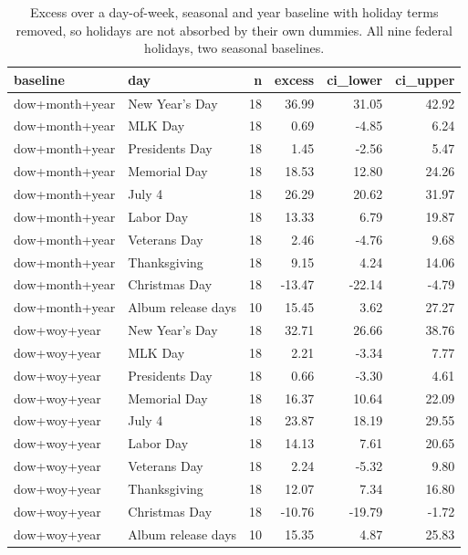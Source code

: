 \begin{table}
\caption{Excess over a day-of-week, seasonal and year baseline with holiday terms removed, so holidays are not absorbed by their own dummies. All nine federal holidays, two seasonal baselines.}
\begin{tabular}{llrrrr}
\toprule
baseline & day & n & excess & ci\_lower & ci\_upper \\
\midrule
dow+month+year & New Year's Day & 18 & 36.99 & 31.05 & 42.92 \\
dow+month+year & MLK Day & 18 & 0.69 & -4.85 & 6.24 \\
dow+month+year & Presidents Day & 18 & 1.45 & -2.56 & 5.47 \\
dow+month+year & Memorial Day & 18 & 18.53 & 12.80 & 24.26 \\
dow+month+year & July 4 & 18 & 26.29 & 20.62 & 31.97 \\
dow+month+year & Labor Day & 18 & 13.33 & 6.79 & 19.87 \\
dow+month+year & Veterans Day & 18 & 2.46 & -4.76 & 9.68 \\
dow+month+year & Thanksgiving & 18 & 9.15 & 4.24 & 14.06 \\
dow+month+year & Christmas Day & 18 & -13.47 & -22.14 & -4.79 \\
dow+month+year & Album release days & 10 & 15.45 & 3.62 & 27.27 \\
dow+woy+year & New Year's Day & 18 & 32.71 & 26.66 & 38.76 \\
dow+woy+year & MLK Day & 18 & 2.21 & -3.34 & 7.77 \\
dow+woy+year & Presidents Day & 18 & 0.66 & -3.30 & 4.61 \\
dow+woy+year & Memorial Day & 18 & 16.37 & 10.64 & 22.09 \\
dow+woy+year & July 4 & 18 & 23.87 & 18.19 & 29.55 \\
dow+woy+year & Labor Day & 18 & 14.13 & 7.61 & 20.65 \\
dow+woy+year & Veterans Day & 18 & 2.24 & -5.32 & 9.80 \\
dow+woy+year & Thanksgiving & 18 & 12.07 & 7.34 & 16.80 \\
dow+woy+year & Christmas Day & 18 & -10.76 & -19.79 & -1.72 \\
dow+woy+year & Album release days & 10 & 15.35 & 4.87 & 25.83 \\
\bottomrule
\end{tabular}
\end{table}
